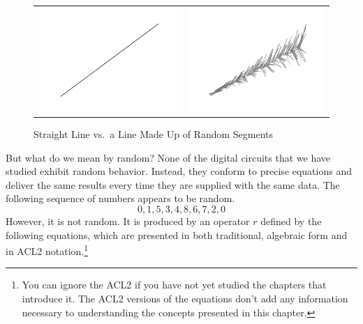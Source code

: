 \begin{figure}
\begin{center}
\begin{tabular}{ll}
\includegraphics[scale=0.3]{images/straight-line.png} &
\includegraphics[scale=0.3]{images/random-line-art.png} \\
\end{tabular}
\end{center}
\caption{Straight Line vs.~a Line Made Up of Random Segments}
\label{fig:line-art}
\end{figure}

But what do we mean by random? 
None of the digital circuits
that we have studied exhibit random behavior.
Instead, they conform to precise equations and deliver the same
results every time they are supplied with the same data.
The following sequence of numbers appears to be random.
$$0, 1, 5, 3, 4, 8, 6, 7, 2, 0$$
However, it is not random. It is produced by an
operator $r$ defined by the following equations,
which are presented in both traditional, algebraic form
and in ACL2 notation.\footnote{You can ignore the ACL2
if you have not yet studied the chapters that introduce it.
The ACL2 versions of the equations don't add any information 
necessary to understanding the concepts presented in this chapter.}

